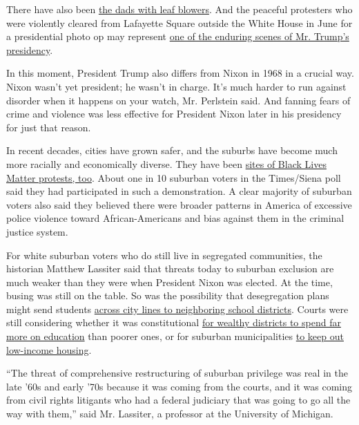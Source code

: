 There have also been
\href{https://www.oregonlive.com/news/2020/07/dad-with-leaf-blower-arrested-tuesday-says-he-was-taken-to-ground-by-federal-officers-during-portland-protest.html}{the
dads with leaf blowers}. And the peaceful protesters who were violently
cleared from Lafayette Square outside the White House in June for a
presidential photo op may represent
\href{https://www.nytimes3xbfgragh.onion/2020/06/02/us/politics/trump-walk-lafayette-square.html}{one
of the enduring scenes of Mr. Trump's presidency}.

In this moment, President Trump also differs from Nixon in 1968 in a
crucial way. Nixon wasn't yet president; he wasn't in charge. It's much
harder to run against disorder when it happens on your watch, Mr.
Perlstein said. And fanning fears of crime and violence was less
effective for President Nixon later in his presidency for just that
reason.

In recent decades, cities have grown safer, and the suburbs have become
much more racially and economically diverse. They have been
\href{https://www.bloomberg.com/news/features/2020-06-19/protests-for-racial-justice-take-root-in-suburbia}{sites
of Black Lives Matter protests, too}. About one in 10 suburban voters in
the Times/Siena poll said they had participated in such a demonstration.
A clear majority of suburban voters also said they believed there were
broader patterns in America of excessive police violence toward
African-Americans and bias against them in the criminal justice system.

For white suburban voters who do still live in segregated communities,
the historian Matthew Lassiter said that threats today to suburban
exclusion are much weaker than they were when President Nixon was
elected. At the time, busing was still on the table. So was the
possibility that desegregation plans might send students
\href{https://www.oyez.org/cases/1973/73-434}{across city lines to
neighboring school districts}. Courts were still considering whether it
was constitutional \href{https://www.oyez.org/cases/1972/71-1332}{for
wealthy districts to spend far more on education} than poorer ones, or
for suburban municipalities
\href{https://supreme.justia.com/cases/federal/us/402/137/}{to keep out
low-income housing}.

``The threat of comprehensive restructuring of suburban privilege was
real in the late '60s and early '70s because it was coming from the
courts, and it was coming from civil rights litigants who had a federal
judiciary that was going to go all the way with them,'' said Mr.
Lassiter, a professor at the University of Michigan.

